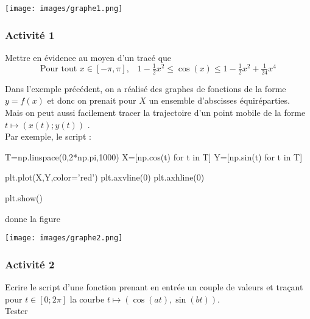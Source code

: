 \documentclass[11pt,a4paper,french,twoside]{PMCours}
\begin{document}
\begin{center}
\texttt{[image: images/graphe1.png]}
\end{center}
\subsubsection*{\vskip -1cm Activité 1}
Mettre en évidence au moyen d'un tracé que 
 $$\mbox{Pour tout }x\in[-\pi,\pi],\;\;\; 1-\tfrac12 {x^2}\leq \cos(x)\leq 1-\tfrac 12 {x^2}+\tfrac 1{24} {x^4}$$
 
Dans l'exemple précédent, on a réalisé des graphes de fonctions de la forme $y=f(x)$ et donc on prenait pour $X$ un ensemble d'abscisses équiréparties.\\
Mais on peut aussi facilement tracer la trajectoire d'un point mobile de la forme $t\mapsto (x(t);y(t))$ .\\ 
Par exemple, le script : 
\begin{Python}
T=np.linspace(0,2*np.pi,1000)
X=[np.cos(t) for t in T]
Y=[np.sin(t) for t in T]

plt.plot(X,Y,color='red')
plt.axvline(0)
plt.axhline(0)

plt.show() 
\end{Python} 

donne la figure 

\begin{center}
\texttt{[image: images/graphe2.png]}
\end{center}

\subsubsection*{Activité 2} 
Ecrire le script d'une fonction  prenant en entrée un couple de valeurs  et traçant pour $t\in[0;2\pi]$ la courbe $t\mapsto (\cos(at),\sin(bt))$. \\
Tester 
\end{document}
